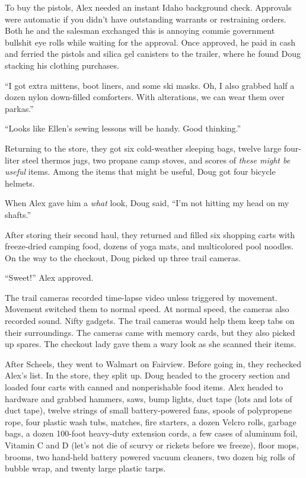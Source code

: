 To buy the pistols, Alex needed an instant Idaho background check.
Approvals were automatic if you didn't have outstanding warrants or
restraining orders. Both he and the salesman exchanged this is annoying
commie government bullshit eye rolls while waiting for the approval.
Once approved, he paid in cash and ferried the pistols and silica gel
canisters to the trailer, where he found Doug stacking his clothing
purchases.

``I got extra mittens, boot liners, and some ski masks. Oh, I also
grabbed half a dozen nylon down-filled comforters. With alterations, we
can wear them over parkas.''

``Looks like Ellen's sewing lessons will be handy. Good thinking.''

Returning to the store, they got six cold-weather sleeping bags, twelve
large four-liter steel thermos jugs, two propane camp stoves, and scores
of \emph{these might be useful} items. Among the items that might be
useful, Doug got four bicycle helmets.

When Alex gave him a \emph{what} look, Doug said, ``I'm not hitting my
head on my shafts.''

After storing their second haul, they returned and filled six shopping
carts with freeze-dried camping food, dozens of yoga mats, and
multicolored pool noodles. On the way to the checkout, Doug picked up
three trail cameras.

``Sweet!'' Alex approved.

The trail cameras recorded time-lapse video unless triggered by
movement. Movement switched them to normal speed. At normal speed, the
cameras also recorded sound. Nifty gadgets. The trail cameras would help
them keep tabs on their surroundings. The cameras came with memory
cards, but they also picked up spares. The checkout lady gave them a
wary look as she scanned their items.

After Scheels, they went to Walmart on Fairview. Before going in, they
rechecked Alex's list. In the store, they split up. Doug headed to the
grocery section and loaded four carts with canned and nonperishable food
items. Alex headed to hardware and grabbed hammers, saws, bump lights,
duct tape (lots and lots of duct tape), twelve strings of small
battery-powered fans, spools of polypropene rope, four plastic wash
tubs, matches, fire starters, a dozen Velcro rolls, garbage bags, a
dozen 100-foot heavy-duty extension cords, a few cases of aluminum foil,
Vitamin C and D (let's not die of scurvy or rickets before we freeze),
floor mops, brooms, two hand-held battery powered vacuum cleaners, two
dozen big rolls of bubble wrap, and twenty large plastic tarps.


